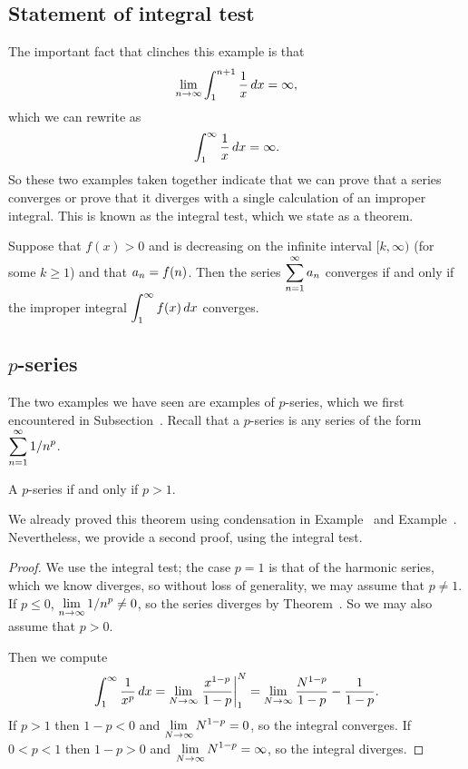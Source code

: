 \subsection{Statement of integral test}

The important fact that clinches this example is that
$$\lim_{n\to\infty} \int_1^{n+1} {1\over x}\,dx = \infty,$$
which we can rewrite as
$$\int_1^\infty {1\over x}\,dx = \infty.$$
So these two examples taken together indicate that we can prove that a
series converges or prove that it diverges with a single calculation
of an improper integral. This is known as the {\dfont integral
  test\/}, 
which we state as a theorem.

\begin{theorem}\label{thm:integral-test}
 Suppose that $f(x)>0$ and is decreasing on the infinite interval
$[k,\infty)$ (for some $k\ge1$)
and that $\displaystyle a_n=f(n)$. Then the series
$\displaystyle\sum_{n=1}^\infty a_n$ converges if and only if the improper
integral $\displaystyle\int_{1}^\infty f(x)\,dx$ converges.
\end{theorem}

\subsection{$p$-series}

The two examples we have seen are examples of
$p$-series, which we first encountered in Subsection~.
Recall that a $p$-series is
any series of the form $\displaystyle \sum_{n=1}^\infty 1/n^p$.

\begin{theorem}\label{thm:p-series} A $p$-series if and only if $p>1$.
\end{theorem}

We already proved this theorem using condensation in Example~ and Example~.  Nevertheless, we provide a second proof, using the integral test.

\begin{proof}
We use the integral test; the case $p=1$ is that of the harmonic series, which we know diverges, so without loss of generality, we may assume that
$p \neq 1$.   If $p\le0$, $\displaystyle\lim_{n\to\infty} 1/n^p\not=0$, so the series diverges by Theorem~. So we may also assume that $p > 0$.

Then we compute
$$
  \int_1^{\infty} {1\over x^p}\,dx=\lim_{N\to\infty} \left.{x^{1-p}\over
  1-p}\right|_{1}^N=\lim_{N\to\infty} {N^{1-p}\over 1-p}-{1\over 1-p}.
$$
If $p>1$ then $1-p<0$ and $\displaystyle\lim_{N\to\infty}N^{1-p}=0$, so the
  integral converges. If $0<p<1$ then $1-p>0$ and 
$\displaystyle\lim_{N\to\infty}N^{1-p}=\infty$, so the integral diverges.
\end{proof}

